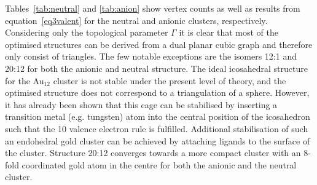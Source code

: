 Tables~\ref{tab:neutral} and \ref{tab:anion} show vertex counts as well as
results from equation~\eqref{eq3valent} for the neutral and anionic clusters,
respectively. Considering only the topological parameter $\Gamma$ it is clear
that most of the optimised structures can be derived from a dual planar cubic
graph and therefore only consist of triangles. The few notable exceptions are
the isomers 12:1 and 20:12 for both the anionic and neutral structure. The ideal
icosahedral structure for the Au$_{12}$ cluster is not stable under the present
level of theory, and the optimised structure does not correspond to a
triangulation of a sphere. However, it has already been shown that this cage can
be stabilised by inserting a transition metal (e.g. tungsten) atom into the
central position of the icosahedron such that the 10 valence electron rule is
fulfilled.\autocite{Pyykko_IcosahedralWAu12Predicted_2002,Autschbach_PropertiesWAu12_2004}
Additional stabilisation of such an endohedral gold cluster can be achieved by
attaching ligands to the surface of the cluster.\autocite{Laupp-1994} Structure
20:12 converges towards a more compact cluster with an 8-fold coordinated gold
atom in the centre for both the anionic and the neutral cluster. 
%
